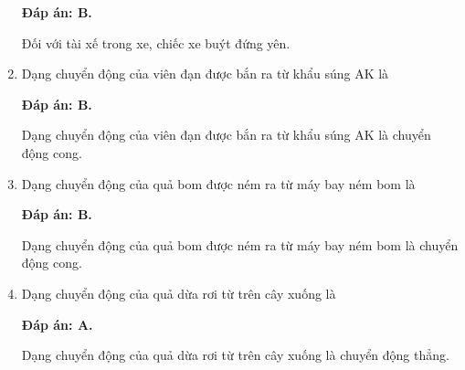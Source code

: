 \begin{enumerate}[label=\bfseries Câu \arabic*:]
	\loigiai
	{\textbf{Đáp án: B.}
		
		Đối với tài xế trong xe, chiếc xe buýt đứng yên.
		
	}
	\item {}
	
	\cauhoi
	{Dạng chuyển động của viên đạn được bắn ra từ khẩu súng AK là
	}
	
	\loigiai
	{\textbf{Đáp án: B.}
		
		Dạng chuyển động của viên đạn được bắn ra từ khẩu súng AK là chuyển động cong.
		
		
	}
	\item {}
	
	\cauhoi
	{
		Dạng chuyển động của quả bom được ném ra từ máy bay ném bom là
	}
	
	\loigiai
	{\textbf{Đáp án: B.}
		
		Dạng chuyển động của quả bom được ném ra từ máy bay ném bom là chuyển động cong. 
		
	}
	
	\item {}
	
	\cauhoi
	{Dạng chuyển động của quả dừa rơi từ trên cây xuống là
		
	}
	
	\loigiai
	{\textbf{Đáp án: A.}
		
	Dạng chuyển động của quả dừa rơi từ trên cây xuống là chuyển động thẳng.		
		
}
\end{enumerate}
